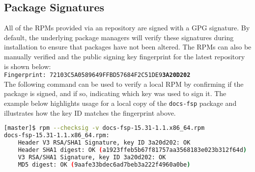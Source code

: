 \clearpage
\subsection{Package Signatures}

All of the RPMs provided via an \FSP{} repository are signed with a GPG
signature. By default, the underlying package managers will verify these signatures during
installation to ensure that packages have not been altered. The RPMs can also
be manually verified and the public signing key fingerprint for the latest
repository is shown below: \\

\texttt{Fingerprint: 72103C5A0589649FFBD57684F2C51DE9{\bf3A20D202}} \\

\noindent The following command can be used to verify a local RPM by confirming if the package
is signed, and if so, indicating which key was used to sign it.  The example
below highlights usage for a local copy of the \texttt{docs-fsp} package and
illustrates how the key ID matches the fingerprint above.

\begin{lstlisting}[language=bash,keywords={}]
[master]$ rpm --checksig -v docs-fsp-15.31-1.1.x86_64.rpm
docs-fsp-15.31-1.1.x86_64.rpm:
    Header V3 RSA/SHA1 Signature, key ID 3a20d202: OK
    Header SHA1 digest: OK (a1923ffeb5b67f81757aa3568183e023b312f64d)
    V3 RSA/SHA1 Signature, key ID 3a20d202: OK
    MD5 digest: OK (9aafe33bdec6ad7beb3a222f4960a0be)
\end{lstlisting}



